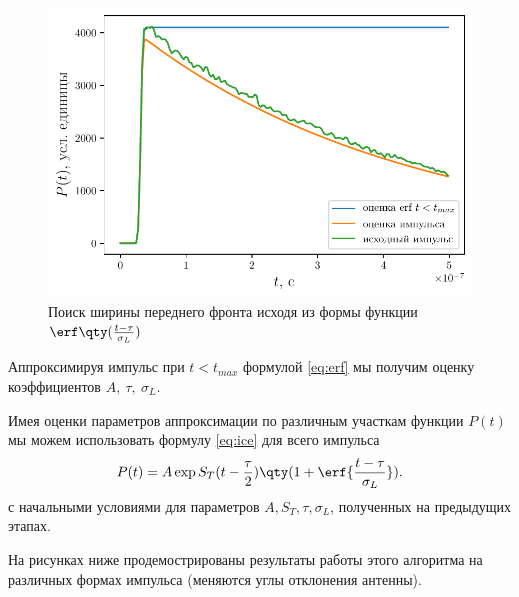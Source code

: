 \begin{figure}[h]
    \centering
    \includegraphics[width=0.75\linewidth]{fig/imp08_7_2.pdf}
    \caption{Поиск ширины переднего фронта исходя из формы функции
    $\erf\qty(\frac{t-\tau}{\sigma_L})$}
    \label{fig:erf}
\end{figure}

Аппроксимируя импульс при $t<t_{max}$ формулой \eqref{eq:erf} мы получим оценку
коэффициентов $A,~\tau,~\sigma_L$. 


 Имея оценки параметров аппроксимации по различным
участкам функции $P(t)$ мы можем использовать формулу  \eqref{eq:ice} для всего
импульса 
\begin{equation}
    \label{eq:ice}
    P(t) = A \exp{ S_T (t - \frac{\tau}{2})} \qty(1 + \erf{\frac{t-
    \tau}{\sigma_L}}).
\end{equation}
с начальными условиями для параметров $A, S_T, \tau, \sigma_L$, полученных на
предыдущих этапах. 


На рисунках ниже продемострированы результаты работы этого алгоритма на
различных формах импульса (меняются углы отклонения антенны).



